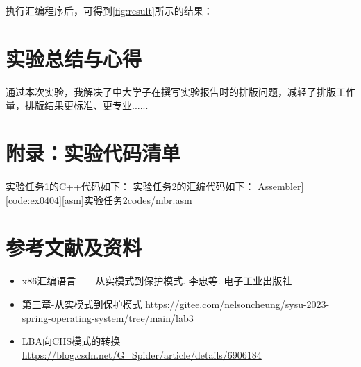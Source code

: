 \documentclass{sysucseexp}
\begin{document}
执行汇编程序后，可得到\autoref{fig:result}所示的结果：
\begin{figure}[H]
  \begin{floatrow}
  \end{floatrow}
\end{figure}

\section{实验总结与心得}
通过本次实验，我解决了中大学子在撰写实验报告时的排版问题，减轻了排版工作量，排版结果更标准、更专业......

\section{附录：实验代码清单}\label{secboxiety}
实验任务1的C++代码如下：
实验任务2的汇编代码如下：
\langCVfile[[x86masm]Assembler][code:ex0404][asm]{实验任务2}{codes/mbr.asm}

\section{参考文献及资料}
\begin{itemize}
  \item x86汇编语言——从实模式到保护模式. 李忠等. 电子工业出版社
  \item 第三章-从实模式到保护模式 
  \url{https://gitee.com/nelsoncheung/sysu-2023-spring-operating-system/tree/main/lab3}
  \item LBA向CHS模式的转换 
  \url{https://blog.csdn.net/G_Spider/article/details/6906184}
\end{itemize}
\end{document}
